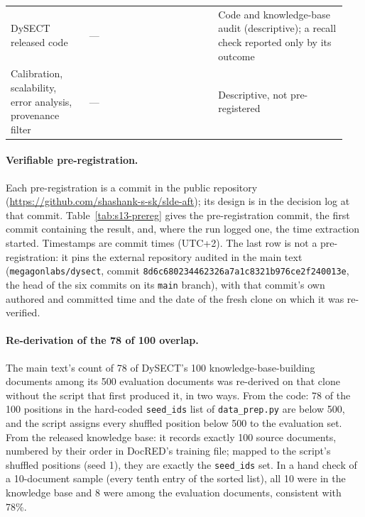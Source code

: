 \documentclass[11pt]{article}
\begin{document}
\begin{table}[htbp]
\begin{tabular}{@{}p{0.22\linewidth}p{0.36\linewidth}p{0.36\linewidth}@{}}
DySECT released code & --- & Code and knowledge-base audit (descriptive); a recall check reported only by its outcome \\
Calibration, scalability, error analysis, provenance filter & --- & Descriptive, not pre-registered \\
\bottomrule
\end{tabular}
\end{table}

\paragraph{Verifiable pre-registration.} Each pre-registration is a
commit in the public repository
(\url{https://github.com/shashank-s-sk/slde-aft}); its design is in the
decision log at that commit. Table~\ref{tab:s13-prereg} gives the
pre-registration commit, the first commit containing the result, and,
where the run logged one, the time extraction started. Timestamps are
commit times (UTC+2). The last row is not a pre-registration: it pins
the external repository audited in the main text
(\texttt{megagonlabs/dysect}, commit
\texttt{8d6c680234462326a7a1c8321b976ce2f240013e}, the head of the six
commits on its \texttt{main} branch), with that commit's own authored and
committed time and the date of the fresh clone on which it was
re-verified.

\paragraph{Re-derivation of the 78 of 100 overlap.} The main text's
count of 78 of DySECT's 100 knowledge-base-building documents among its
500 evaluation documents was re-derived on that clone without the script
that first produced it, in two ways. From the code: 78 of the 100
positions in the hard-coded \texttt{seed\_ids} list of
\texttt{data\_prep.py} are below 500, and the script assigns every
shuffled position below 500 to the evaluation set. From the released
knowledge base: it records exactly 100 source documents, numbered by
their order in DocRED's training file; mapped to the script's shuffled
positions (seed 1), they are exactly the \texttt{seed\_ids} set. In a
hand check of a 10-document sample (every tenth entry of the sorted
list), all 10 were in the knowledge base and 8 were among the evaluation
documents, consistent with 78\%.
\end{document}
